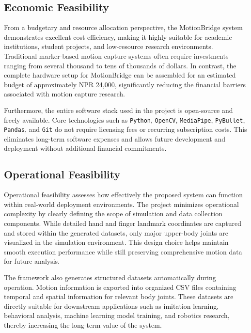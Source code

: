 \subsection{Economic Feasibility}

From a budgetary and resource allocation perspective, the MotionBridge system demonstrates excellent cost efficiency, making it highly suitable for academic institutions, student projects, and low-resource research environments. Traditional marker-based motion capture systems often require investments ranging from several thousand to tens of thousands of dollars. In contrast, the complete hardware setup for MotionBridge can be assembled for an estimated budget of approximately NPR 24,000, significantly reducing the financial barriers associated with motion capture research.

Furthermore, the entire software stack used in the project is open-source and freely available. Core technologies such as \texttt{Python}, \texttt{OpenCV}, \texttt{MediaPipe}, \texttt{PyBullet}, \texttt{Pandas}, and \texttt{Git} do not require licensing fees or recurring subscription costs. This eliminates long-term software expenses and allows future development and deployment without additional financial commitments.

\subsection{Operational Feasibility}

Operational feasibility assesses how effectively the proposed system can function within real-world deployment environments. The project minimizes operational complexity by clearly defining the scope of simulation and data collection components. While detailed hand and finger landmark coordinates are captured and stored within the generated datasets, only major upper-body joints are visualized in the simulation environment. This design choice helps maintain smooth execution performance while still preserving comprehensive motion data for future analysis.

The framework also generates structured datasets automatically during operation. Motion information is exported into organized CSV files containing temporal and spatial information for relevant body joints. These datasets are directly suitable for downstream applications such as imitation learning, behavioral analysis, machine learning model training, and robotics research, thereby increasing the long-term value of the system.

